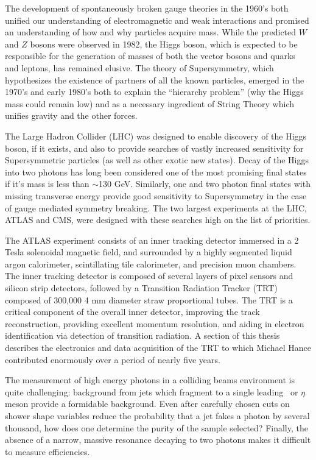 The development of spontaneously broken gauge theories in the 1960’s  both unified our understanding of electromagnetic and weak interactions and promised an understanding of how and why particles acquire mass. While the predicted $W$ and $Z$ bosons were observed in 1982, the Higgs boson, which is expected to be responsible for the generation of masses of both the vector bosons and quarks and leptons, has remained elusive.  The theory of Supersymmetry, which hypothesizes the existence of partners of all the known particles, emerged in the 1970’s and early 1980’s both to explain the “hierarchy problem” (why the Higgs mass could remain low) and as a necessary ingredient of String Theory which unifies gravity and the other forces.

	The Large Hadron Collider (LHC) was designed to enable discovery of the Higgs boson, if it exists, and also to provide searches of vastly increased sensitivity for Supersymmetric particles (as well as other exotic new states). Decay of the Higgs into two photons has long been considered one of the most promising final states if it’s mass is less than $\sim$130 GeV. Similarly, one and two photon final states with missing transverse energy provide good sensitivity to Supersymmetry in the case of gauge mediated symmetry breaking.  The two largest experiments at the LHC, ATLAS and CMS, were designed with these searches high on the list of priorities.

	 The ATLAS experiment consists of an inner tracking detector  immersed in a 2 Tesla solenoidal magnetic field, and surrounded by a highly segmented liquid argon calorimeter, scintillating tile calorimeter, and precision muon chambers.  The inner tracking detector is composed of several layers of pixel sensors and silicon strip detectors, followed by a Transition Radiation Tracker (TRT) composed of 300,000 4 mm diameter straw proportional tubes. The TRT is a critical component of the overall inner detector, improving the track reconstruction,  providing excellent momentum resolution, and aiding in electron identification via detection of transition radiation. A section of this thesis describes the electronics and data acquisition of the TRT to which Michael Hance contributed enormously over a period of nearly five years.

	The measurement of high energy photons in a colliding beams environment is quite challenging: background from jets which fragment to a single leading \pizero\ or $\eta$ meson provide a formidable background.   Even after carefully chosen cuts on shower shape variables reduce the probability that a jet fakes a photon by several thousand, how does one determine the purity of the sample selected?  Finally, the absence of a narrow, massive resonance decaying to two photons makes it difficult to measure efficiencies. 

